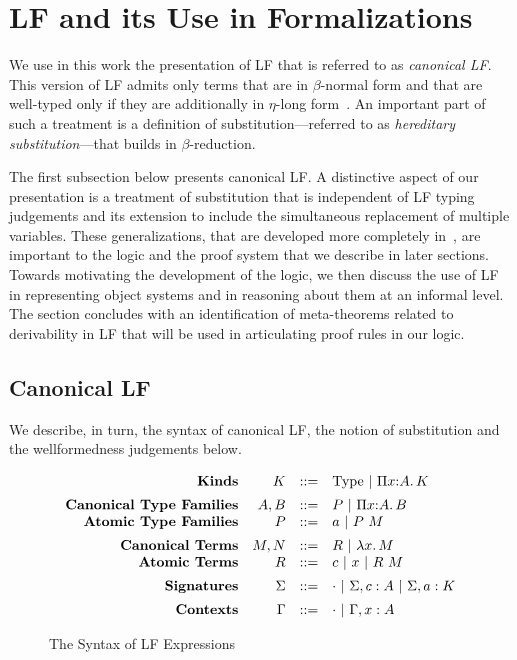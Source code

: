 \section{LF and its Use in Formalizations}
\label{sec:lf}

We use in this work the presentation of LF that is referred to as
\emph{canonical LF}.
%
This version of LF admits only terms that are in $\beta$-normal form
and that are well-typed only if they are additionally in $\eta$-long
form~\cite{harper07jfp,watkins03tr}.
%
An important part of such a treatment is a definition of
substitution---referred to as \emph{hereditary substitution}---that
builds in $\beta$-reduction.

The first subsection below presents canonical LF.
%
A distinctive aspect of our presentation is a treatment of
substitution that is independent of LF typing judgements and its
extension to include the simultaneous replacement of multiple
variables.
%
These generalizations, that are developed more completely
in~\cite{nadathur21arxiv}, are important to the logic and the proof
system that we describe in later sections. 
%
Towards motivating the development of the logic, 
we then discuss the use of LF in representing
object systems and in reasoning about them at an informal level.
%
The section concludes with an identification of meta-theorems related
to derivability in LF that will be used in articulating proof rules in
our logic.

\subsection{Canonical LF}\label{ssec:lf-syntax}

We describe, in turn, the syntax of canonical LF, the notion of
substitution and the wellformedness judgements below. 

\begin{figure}[htpb]
\[
\begin{array}{r r c l}
  \mbox{\bf Kinds} & K & ::= & \type\ |\ \typedpi{x}{A}{K}\\[5pt]

  \mbox{\bf Canonical Type Families} & A,B & ::= &
           P\ |\ \typedpi{x}{A}{B}\\
  \mbox{\bf Atomic Type Families} & P & ::= & a\ |\ P\app M\\[5pt]
  \mbox{\bf Canonical Terms} & M,N & ::= & R\ |\ \lflam{x}{M}\\
  \mbox{\bf Atomic Terms} & R & ::= & c\ |\ x\ |\ R\app M\\[5pt]
  \mbox{\bf Signatures} & \Sigma & ::= &
  \emptysig\ |\ \Sigma,c:A\ |\ \Sigma,a:K\\[5pt]
  \mbox{\bf Contexts} & \Gamma & ::= & \emptyctx\ |\ \Gamma,x:A
\end{array}
\]
\caption{The Syntax of LF Expressions}
\label{fig:lf-terms}
\end{figure}

